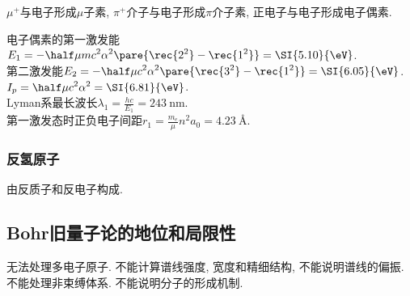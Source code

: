 \documentclass[hidelinks]{ctexart}
\begin{document}
$\mu^+$与电子形成$\mu$子素, $\pi^+$介子与电子形成$\pi$介子素, 正电子与电子形成电子偶素.
\begin{sample}
    \begin{ex}
        电子偶素的第一激发能$\displaystyle E_1 = -\half \mu mc^2\alpha^2 \pare{\rec{2^2} - \rec{1^2}} = \SI{5.10}{\eV}$.\\
        第二激发能$\displaystyle E_2 = -\half \mu c^2\alpha^2 \pare{\rec{3^2} - \rec{1^2}} = \SI{6.05}{\eV}$.\\
        $\displaystyle I_p = \half \mu c^2\alpha^2 = \SI{6.81}{\eV}$.\\
        Lyman系最长波长$\displaystyle \lambda_1 = \frac{hc}{E_1} = \SI{243}{\nano\meter}$.\\
        第一激发态时正负电子间距$\displaystyle r_1 = \frac{m_e}{\mu}n^2a_0 = \SI{4.23}{\angstrom}$.
    \end{ex}
\end{sample}


\subsubsection{反氢原子} %
\label{ssub:反氢原子}

由反质子和反电子构成.



\subsection{Bohr旧量子论的地位和局限性} %
\label{sub:bohr旧量子论的地位和局限性}

无法处理多电子原子. 不能计算谱线强度, 宽度和精细结构, 不能说明谱线的偏振. 不能处理非束缚体系. 不能说明分子的形成机制.


\end{document}

